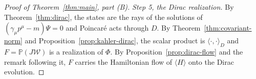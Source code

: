 \begin{proof}[Proof of Theorem~\ref{thm:main}, part (B)]
	\emph{Step 5, the Dirac realization.} By Theorem~\ref{thm:dirac}, the states are the rays of the solutions of $(\gamma_\mu p^\mu-m)\Psi=0$ and Poincar\'e acts through $D$. By Theorem~\ref{thm:covariant-norm} and Proposition~\ref{prop:kahler-dirac}, the scalar product is $\langle\cdot,\cdot\rangle_D$ and $F=\mathbb{P}(J\mathcal{W})$ is a realization of $\Phi$. By Proposition~\ref{prop:dirac-flow} and the remark following it, $F$ carries the Hamiltonian flow of $\langle H\rangle$ onto the Dirac evolution.
\end{proof}
